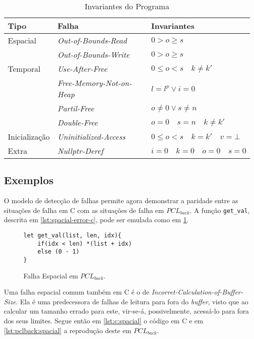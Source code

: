 \begin{table}[ht]
	\centering
	\caption{Invariantes do Programa}
	\label{table:invariants}
	\begin{tabular}{lll}
		\toprule 
		Tipo & Falha & Invariantes \\
		\midrule
		Espacial	& \emph{Out-of-Bounds-Read} & $0 > o \ge s$ \\
		 			& \emph{Out-of-Bounds-Write} & $0 > o \ge s$ \\
		Temporal 	& \emph{Use-After-Free} & $0 \le o < s \quad k \neq k'$\\
		 			& \emph{Free-Memory-Not-on-Heap} & $l = l^p \lor i = 0$ \\
		 			& \emph{Partil-Free} & $o \neq 0 \lor s \neq n$ \\
		 			& \emph{Double-Free} & $o = 0 \quad s = n \quad k \neq k'$ \\
		Inicialização 	& \emph{Uninitialized-Access} & $0 \le o < s \quad k = k' \quad v = \bot$  \\
		Extra 	    & \emph{Nullptr-Deref} & $i = 0 \quad k = 0 \quad o = 0 \quad s = 0$  \\
		\bottomrule
	\end{tabular}
\end{table}

\subsection{Exemplos}

O modelo de detecção de falhas permite agora demonstrar a paridade entre as situações de falha em C com as situações de falha em $PCL_{back}$. A função \lstinline[language=C]|get_val|, descrita em \ref{lst:spacial-error-c}, pode ser emulada como em \ref{lst:pcls:espacial-error}.

\begin{figure}[ht]
	\caption{Falha Espacial em $PCL_{back}$.} 
	\label{lst:pcls:espacial-error}
	\begin{lstlisting}[language=PCLback]
let get_val(list, len, idx){
	if(idx < len) *(list + idx)
	else (0 - 1)
}
	\end{lstlisting}
\end{figure}

Uma falha espacial comum também em C é o de \emph{Incorret-Calculation-of-Buffer-Size}. Ela é uma predecessora de falhas de leitura para fora do \emph{buffer}, visto que ao calcular um tamanho errado para este, vir-se-á, possivelmente, acessá-lo para fora dos seus limites. Segue então em \ref{lst:c:spacial} o código em C e em \ref{lst:pclback:spacial} a reprodução deste em $PCL_{back}$.


